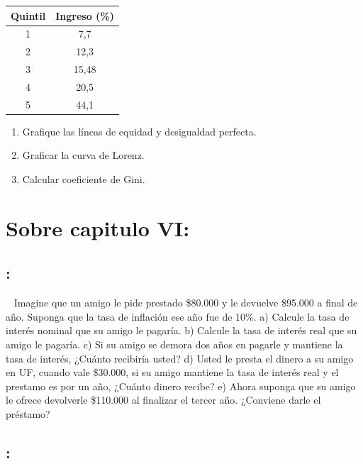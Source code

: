 \documentclass[
  letterpaper,
  DIV=11,
  numbers=noendperiod]{scrreport}
\providecommand{\tightlist}{%
  \setlength{\itemsep}{0pt}\setlength{\parskip}{0pt}}\usepackage{longtable,booktabs,array}
\begin{document}
\begin{table}[H]
\begin{tabular}{|c|c|}       
     \hline
    Quintil & Ingreso (\%) \\ \hline
     1  & 7,7  \\ \hline
     2  & 12,3 \\ \hline
     3  & 15,48 \\  \hline
     4  & 20,5 \\ \hline
     5  & 44,1 \\ \hline
    
\end{tabular}
\end{table}

\begin{enumerate}
\def\labelenumi{\alph{enumi})}
\tightlist
\item
  Grafique las líneas de equidad y desigualdad perfecta.
\item
  Graficar la curva de Lorenz.
\item
  Calcular coeficiente de Gini.
\end{enumerate}

\hypertarget{sobre-capitulo-vi}{%
\section{Sobre capitulo VI:}\label{sobre-capitulo-vi}}

\hypertarget{section-62}{%
\subsection{:}\label{section-62}}

~ Imagine que un amigo le pide prestado \$80.000 y le devuelve \$95.000
a final de año. Suponga que la tasa de inflación ese año fue de 10\%. a)
Calcule la tasa de interés nominal que su amigo le pagaría. b) Calcule
la tasa de interés real que su amigo le pagaría. c) Si su amigo se
demora dos años en pagarle y mantiene la tasa de interés, ¿Cuánto
recibiría usted? d) Usted le presta el dinero a su amigo en UF, cuando
vale \$30.000, si su amigo mantiene la tasa de interés real y el
prestamo es por un año, ¿Cuánto dinero recibe? e) Ahora suponga que su
amigo le ofrece devolverle \$110.000 al finalizar el tercer año.
¿Conviene darle el préstamo?

\hypertarget{section-63}{%
\subsection{:}\label{section-63}}
\end{document}
